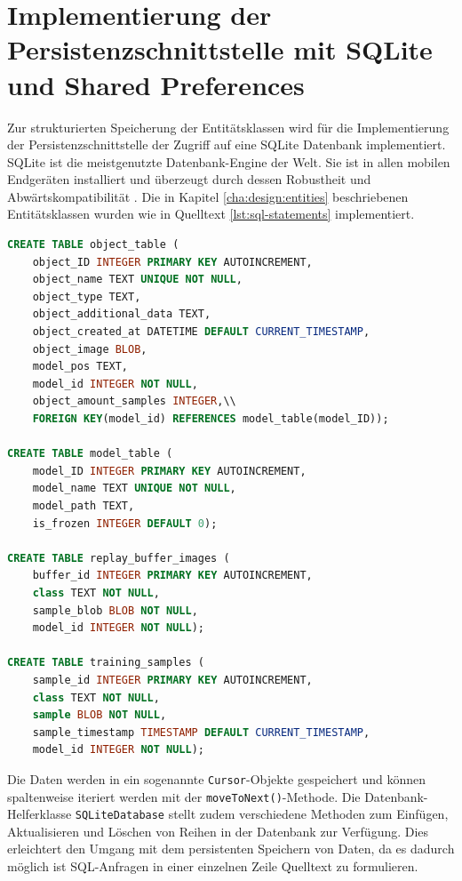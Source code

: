 \documentclass[oneside]{ausarbeitung}
\begin{document}
\section{Implementierung der Persistenzschnittstelle mit SQLite und Shared Preferences}
Zur strukturierten Speicherung der Entitätsklassen wird für die Implementierung der Persistenzschnittstelle der Zugriff auf eine SQLite Datenbank implementiert. SQLite ist die meistgenutzte Datenbank-Engine der Welt. Sie ist in allen mobilen Endgeräten installiert und überzeugt durch dessen Robustheit und Abwärtskompatibilität \cite{sqlite-documentation}. Die in Kapitel \ref{cha:design:entities} beschriebenen Entitätsklassen wurden wie in Quelltext \ref{lst:sql-statements} implementiert.\\
\begin{minipage}{\linewidth}
\begin{lstlisting}[language=SQL, breaklines=true, caption={SQLite Statements zum Erstellen der Tabellen}]
CREATE TABLE object_table (
	object_ID INTEGER PRIMARY KEY AUTOINCREMENT,
	object_name TEXT UNIQUE NOT NULL,
	object_type TEXT,
	object_additional_data TEXT,
	object_created_at DATETIME DEFAULT CURRENT_TIMESTAMP,
	object_image BLOB,
	model_pos TEXT,
	model_id INTEGER NOT NULL,
	object_amount_samples INTEGER,\\
	FOREIGN KEY(model_id) REFERENCES model_table(model_ID));

CREATE TABLE model_table (
	model_ID INTEGER PRIMARY KEY AUTOINCREMENT,
	model_name TEXT UNIQUE NOT NULL,
	model_path TEXT,
	is_frozen INTEGER DEFAULT 0);

CREATE TABLE replay_buffer_images (
	buffer_id INTEGER PRIMARY KEY AUTOINCREMENT,
	class TEXT NOT NULL, 
	sample_blob BLOB NOT NULL,
	model_id INTEGER NOT NULL);
	
CREATE TABLE training_samples (
	sample_id INTEGER PRIMARY KEY AUTOINCREMENT,
	class TEXT NOT NULL,
	sample BLOB NOT NULL,
	sample_timestamp TIMESTAMP DEFAULT CURRENT_TIMESTAMP,
	model_id INTEGER NOT NULL);
\end{lstlisting}
\end{minipage}
\label{lst:sql-statements}
Die Daten werden in ein sogenannte \texttt{Cursor}-Objekte gespeichert und können spaltenweise iteriert werden mit der \texttt{moveToNext()}-Methode. Die Datenbank-Helferklasse \texttt{SQLiteDatabase} stellt zudem verschiedene Methoden zum Einfügen, Aktualisieren und Löschen von Reihen in der Datenbank zur Verfügung. Dies erleichtert den Umgang mit dem persistenten Speichern von Daten, da es dadurch möglich ist SQL-Anfragen in einer einzelnen Zeile Quelltext zu formulieren.\\
\end{document}

